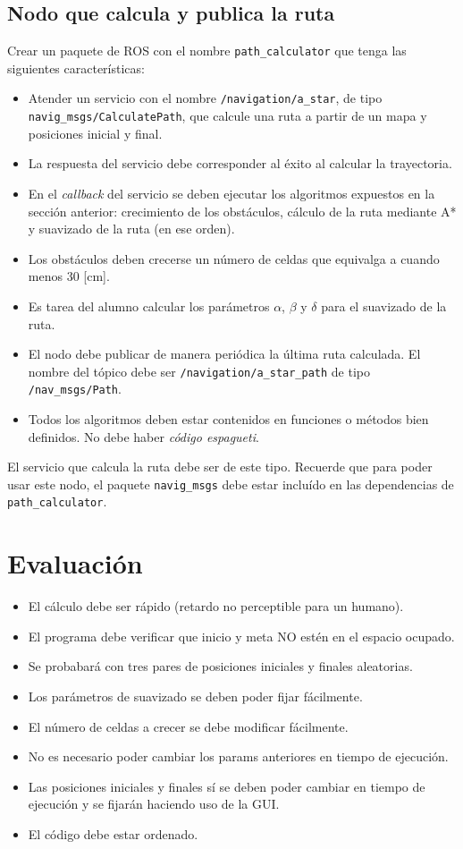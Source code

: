 \documentclass[letterpaper,12pt]{article}
\begin{document}
\subsection{Nodo que calcula y publica la ruta}
Crear un paquete de ROS con el nombre \texttt{path\_calculator} que tenga las siguientes características:
\begin{itemize}
\item Atender un servicio con el nombre \texttt{/navigation/a\_star}, de tipo \texttt{navig\_msgs/CalculatePath}, que calcule una ruta a partir de un mapa y posiciones inicial y final. 
\item La respuesta del servicio debe corresponder al éxito al calcular la trayectoria.
\item En el \textit{callback} del servicio se deben ejecutar los algoritmos expuestos en la sección anterior: crecimiento de los obstáculos, cálculo de la ruta mediante A* y suavizado de la ruta (en ese orden).
\item Los obstáculos deben crecerse un número de celdas que equivalga a cuando menos 30 [cm].
\item Es tarea del alumno calcular los parámetros $\alpha$, $\beta$ y $\delta$ para el suavizado de la ruta.
\item El nodo debe publicar de manera periódica la última ruta calculada. El nombre del tópico debe ser \texttt{/navigation/a\_star\_path} de tipo \texttt{/nav\_msgs/Path}.
\item Todos los algoritmos deben estar contenidos en funciones o métodos bien definidos. No debe haber \textit{código espagueti}.
\end{itemize}

El servicio que calcula la ruta debe ser de este tipo. Recuerde que para poder usar este nodo, el paquete \texttt{navig\_msgs} debe estar incluído en las dependencias de \texttt{path\_calculator}.

\section{Evaluación}
\begin{itemize}
\item El cálculo debe ser rápido (retardo no perceptible para un humano). 
\item El programa debe verificar que  inicio y meta NO estén en el espacio ocupado.
\item Se probabará con tres pares de posiciones iniciales y finales aleatorias.
\item Los parámetros de suavizado se deben poder fijar fácilmente.
\item El número de celdas a crecer se debe modificar fácilmente.
\item No es necesario poder cambiar los params anteriores en tiempo de ejecución. 
\item Las posiciones iniciales y finales sí se deben poder cambiar en tiempo de ejecución y se fijarán haciendo uso de la GUI.
\item El código debe estar ordenado.
\end{itemize}
\end{document}
